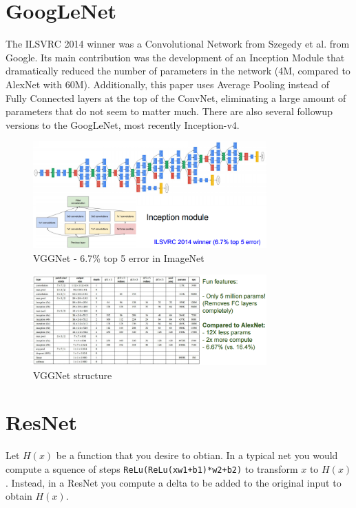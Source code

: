 \section*{GoogLeNet}
The ILSVRC 2014 winner was a Convolutional Network from Szegedy et al. from Google. Its main contribution was the development of an Inception Module that dramatically reduced the number of parameters in the network (4M, compared to AlexNet with 60M). Additionally, this paper uses Average Pooling instead of Fully Connected layers at the top of the ConvNet, eliminating a large amount of parameters that do not seem to matter much. There are also several followup versions to the GoogLeNet, most recently Inception-v4. 
\begin{figure}[h]
  \centering
  \includegraphics[width=0.8\textwidth]{Images/famous_networks/4.png}
  \caption{VGGNet - 6.7\% top 5 error in ImageNet}
\end{figure}
\begin{figure}[h]
  \centering
  \includegraphics[width=0.8\textwidth]{Images/famous_networks/5.png}
  \caption{VGGNet structure}
\end{figure}

\section*{ResNet}
Let $H(x)$ be a function that you desire to obtian. In a typical net you would compute a squence of steps \texttt{ReLu(ReLu(xw1+b1)*w2+b2)} to transform $x$ to $H(x)$. Instead, in a ResNet you compute a delta to be added to the original input to obtain $H(x)$.

